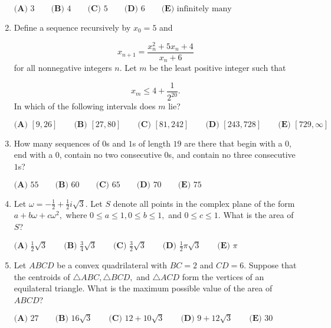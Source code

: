 \documentclass{article}
\begin{document}
\begin{enumerate}[label=\arabic*., itemsep=0.5em]
\(\textbf{(A) } 3 \qquad\textbf{(B) } 4 \qquad\textbf{(C) } 5 \qquad\textbf{(D) } 6 \qquad\textbf{(E) } \text{infinitely many}\)\par \vspace{0.5em}\item Define a sequence recursively by \(x_0=5\) and

\begin{equation*}
x_{n+1}=\frac{x_n^2+5x_n+4}{x_n+6}
\end{equation*}
for all nonnegative integers \(n.\) Let \(m\) be the least positive integer such that

\begin{equation*}
x_m\leq 4+\frac{1}{2^{20}}.
\end{equation*}
In which of the following intervals does \(m\) lie?

\(\textbf{(A) } [9,26] \qquad\textbf{(B) } [27,80] \qquad\textbf{(C) } [81,242]\qquad\textbf{(D) } [243,728] \qquad\textbf{(E) } [729,\infty]\)\par \vspace{0.5em}\item How many sequences of \(0\)s and \(1\)s of length \(19\) are there that begin with a \(0\), end with a \(0\), contain no two consecutive \(0\)s, and contain no three consecutive \(1\)s?

\(\textbf{(A) }55\qquad\textbf{(B) }60\qquad\textbf{(C) }65\qquad\textbf{(D) }70\qquad\textbf{(E) }75\)\par \vspace{0.5em}\item Let \(\omega=-\tfrac{1}{2}+\tfrac{1}{2}i\sqrt3.\) Let \(S\) denote all points in the complex plane of the form \(a+b\omega+c\omega^2,\) where \(0\leq a \leq 1,0\leq b\leq 1,\) and \(0\leq c\leq 1.\) What is the area of \(S\)?

\(\textbf{(A) } \frac{1}{2}\sqrt3 \qquad\textbf{(B) } \frac{3}{4}\sqrt3 \qquad\textbf{(C) } \frac{3}{2}\sqrt3\qquad\textbf{(D) } \frac{1}{2}\pi\sqrt3 \qquad\textbf{(E) } \pi\)\par \vspace{0.5em}\item Let \(ABCD\) be a convex quadrilateral with \(BC=2\) and \(CD=6.\) Suppose that the centroids of \(\triangle ABC,\triangle BCD,\) and \(\triangle ACD\) form the vertices of an equilateral triangle. What is the maximum possible value of the area of \(ABCD\)?

\(\textbf{(A) } 27 \qquad\textbf{(B) } 16\sqrt3 \qquad\textbf{(C) } 12+10\sqrt3 \qquad\textbf{(D) } 9+12\sqrt3 \qquad\textbf{(E) } 30\)\par \vspace{0.5em}\end{enumerate}
\end{document}
